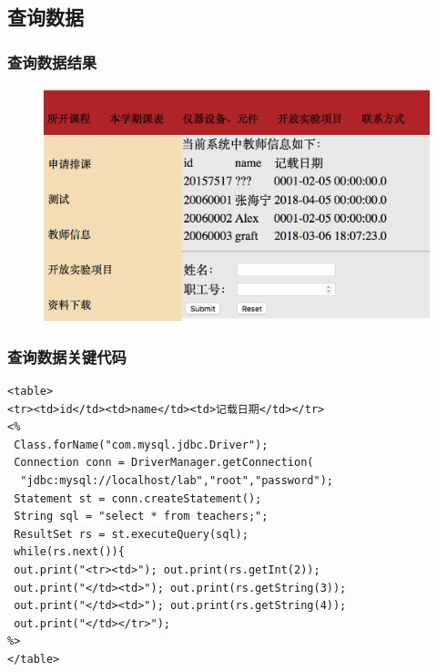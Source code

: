 \documentclass{beamer}
\begin{document}
\subsection{查询数据}
\begin{frame}
\frametitle{查询数据结果}
\begin{figure}
\includegraphics[width=1\linewidth]{sql4.png}
\end{figure}
\end{frame}

\begin{frame}[fragile]
\frametitle{查询数据关键代码}
\begin{lstlisting}
<table>
<tr><td>id</td><td>name</td><td>记载日期</td></tr>
<%	
 Class.forName("com.mysql.jdbc.Driver");
 Connection conn = DriverManager.getConnection(
  "jdbc:mysql://localhost/lab","root","password");
 Statement st = conn.createStatement();
 String sql = "select * from teachers;";
 ResultSet rs = st.executeQuery(sql);
 while(rs.next()){
 out.print("<tr><td>"); out.print(rs.getInt(2));
 out.print("</td><td>"); out.print(rs.getString(3));
 out.print("</td><td>"); out.print(rs.getString(4));
 out.print("</td></tr>");
%>
</table>
\end{lstlisting}
\end{frame}
\end{document}

